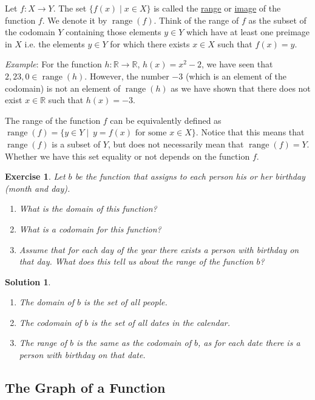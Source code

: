 \documentclass[12pt]{article}
\newtheorem{ex}{Exercise}[section]
\newtheorem{sol}[prop]{Solution}
\DeclareMathOperator{\range}{range}
\begin{document}
Let  $f:X\to Y$. The set  $\{f(x)\mid x\in X\}$ is called the \underline{range} or \underline{image} of the function $f$. We denote it by $\range(f)$. Think of the range of $f$ as the subset of the codomain 
$Y$ containing those elements $y\in Y$ which have at least one preimage in $X$ i.e. the elements $y\in Y$ for which there exists $x\in X$ such that $f(x)=y$. 

\textit{Example}: For the function $h:\mathbb{R}\to \mathbb{R}$, $h(x)=x^{2}-2$, we have seen that $2, 23, 0\in \range(h)$. However, the number $-3$ (which is an element of the codomain) is not an element of $\range(h)$ as we have shown that there does not exist $x\in \mathbb{R}$ such that $h(x)=-3$.

The range of the function $f$ can be equivalently defined as $\range(f)=\{y\in Y\mid \ y=f(x) \text{ for some }x\in X\}$. Notice that this means that $\range(f)$ is a subset of $Y$, but does not necessarily mean that $\range(f)=Y$. Whether we have this set equality or not depends on the function $f$.

\begin{ex}
Let  $b$ be the function that assigns to each person his or her birthday (month and day).
\begin{enumerate}
\item[a)]  What is the domain of this function?
\item[b)] What is a codomain for this function?
\item[c)] Assume that for each day of the year there exists a person with birthday on that day. What does this tell us about the range of the function $b$?
\end{enumerate}
\end{ex}

\begin{sol}
\begin{enumerate}
\item[a)] The domain of $b$ is the set of all people. 
\item[b)] The codomain of $b$ is the set of all dates in the calendar. 
\item[c)] The range of $b$ is the same as the codomain of $b$, as for each date there is a person with birthday on that date.
\end{enumerate}
\end{sol}

\subsection{The Graph of a Function}
\end{document}
